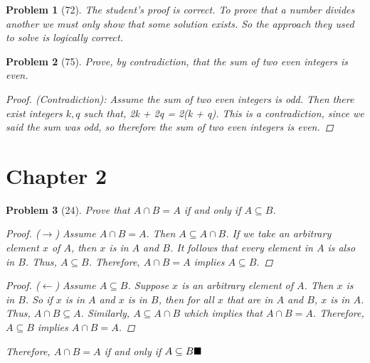 \documentclass{article}
\theoremstyle{problem}
\newtheorem{prob}{Problem}
\renewcommand{\qedsymbol}{$\blacksquare$}
\def\bs{\hspace{\stretch1}\ensuremath\blacksquare}
\begin{document}
\begin{prob}[72]
The student's proof is correct. To prove that a number divides another we must only show that some solution exists. So the approach they used to solve is logically correct.
\end{prob}

\begin{prob}[75]
  Prove, by contradiction, that the sum of two even integers is even.
\begin{proof}\textit{(Contradiction)}: Assume the sum of two even integers is odd. Then there exist integers $k,q$ such that, 2k + 2q = 2(k + q). This is a contradiction, since we said the sum was odd, so therefore the sum of two even integers is even.
\end{proof}

\end{prob}

\section*{Chapter 2}
\begin{prob}[24]
Prove that $A \cap B = A$ if and only if $A \subseteq B$.
\renewcommand\qedsymbol{}
\begin{proof}($\rightarrow$)
Assume $A \cap B = A$. Then $A \subseteq A \cap B$. If we take an arbitrary element $x$ of $A$, then $x$ is in $A$ and $B$. It follows that every element in $A$ is also in $B$. Thus, $A \subseteq B$. Therefore, $A \cap B = A$ implies $A \subseteq B$.
\end{proof}
\begin{proof}($\leftarrow$)
Assume $A \subseteq B$. Suppose $x$ is an arbitrary element of $A$. Then $x$ is in $B$. So if $x$ is in $A$ and $x$ is in $B$, then for all $x$ that are in $A$ and $B$, $x$ is in $A$. Thus, $A \cap B \subseteq A$. Similarly, $A \subseteq A \cap B$ which implies that $A \cap B = A$. Therefore, $A \subseteq B$ implies $A \cap B = A$.
\end{proof}
\renewcommand{\qedsymbol}{$\blacksquare$}
Therefore, $A \cap B = A$ if and only if $A \subseteq B\bs$
\end{prob}
\end{document}
